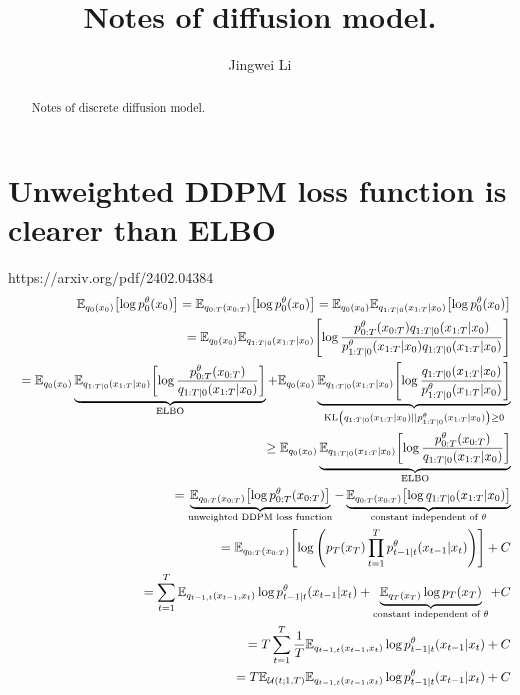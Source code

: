 \documentclass[10pt]{article}
\begin{document}
\title{
  \bf Notes of diffusion model.
}

\author[1]{Jingwei Li}

\baselineskip=0pt


%

\maketitle

\begin{abstract}
Notes of discrete diffusion model.
\end{abstract}

\section{Unweighted DDPM loss function is clearer than ELBO}
https://arxiv.org/pdf/2402.04384
\begin{eqnarray*}
  &&\mathbb{E}_{q_0(x_0)}\qty[\log p_0^{\theta}(x_0)]=\mathbb{E}_{q_{0:T}(x_{0:T})}\qty[\log p_0^{\theta}(x_0)]=\mathbb{E}_{q_0(x_0)}\mathbb{E}_{q_{1:T|0}(x_{1:T}|x_0)}\qty[\log p_0^{\theta}(x_0)]\\
  &&=\mathbb{E}_{q_0(x_0)}\mathbb{E}_{q_{1:T|0}(x_{1:T}|x_0)}\qty[\log \frac{p_{0:T}^{\theta}(x_{0:T})q_{1:T|0}(x_{1:T}|x_0)}{p_{1:T|0}^{\theta}(x_{1:T}|x_0)q_{1:T|0}(x_{1:T}|x_0)}]\\
  &&=\mathbb{E}_{q_0(x_0)}\underbrace{\mathbb{E}_{q_{1:T|0}(x_{1:T}|x_0)}\qty[\log \frac{p_{0:T}^{\theta}(x_{0:T})}{q_{1:T|0}(x_{1:T}|x_0)}]}_\text{ELBO} + \mathbb{E}_{q_0(x_0)}\underbrace{\mathbb{E}_{q_{1:T|0}(x_{1:T}|x_0)}\qty[\log \frac{q_{1:T|0}(x_{1:T}|x_0)}{p_{1:T|0}^{\theta}(x_{1:T}|x_0)}]}_{\text{KL}\qty(q_{1:T|0}(x_{1:T}|x_0)||p_{1:T|0}^{\theta}(x_{1:T}|x_0))\ge 0}\\
  &&\ge \mathbb{E}_{q_0(x_0)}\underbrace{\mathbb{E}_{q_{1:T|0}(x_{1:T}|x_0)}\qty[\log \frac{p_{0:T}^{\theta}(x_{0:T})}{q_{1:T|0}(x_{1:T}|x_0)}]}_\text{ELBO}\\
  &&=\underbrace{\mathbb{E}_{q_{0:T}(x_{0:T})}\qty[\log p_{0:T}^{\theta}(x_{0:T})]}_\text{unweighted DDPM loss function} - \underbrace{\mathbb{E}_{q_{0:T}(x_{0:T})}\qty[\log q_{1:T|0}(x_{1:T}|x_0)]}_\text{constant independent of $\theta$}\\
  &&=\mathbb{E}_{q_{0:T}(x_{0:T})}\qty[\log \qty(p_T(x_T)\prod_{t=1}^{T} p_{t-1|t}^{\theta}(x_{t-1}|x_t))] + C\\
  &&=\sum_{t=1}^T\mathbb{E}_{q_{t-1,t}(x_{t-1},x_t)}\log p_{t-1|t}^\theta(x_{t-1}|x_t) + \underbrace{\mathbb{E}_{q_T(x_T)} \log p_T(x_T)}_\text{constant independent of $\theta$} + C\\
  &&=T\sum_{t=1}^T \frac{1}{T}\mathbb{E}_{q_{t-1,t}(x_{t-1},x_t)}\log p_{t-1|t}^\theta(x_{t-1}|x_t) + C\\
  &&=T\mathbb{E}_{\mathcal{U}(t;1,T)}\mathbb{E}_{q_{t-1,t}(x_{t-1},x_t)}\log p_{t-1|t}^\theta(x_{t-1}|x_t) + C
\end{eqnarray*}
\end{document}
